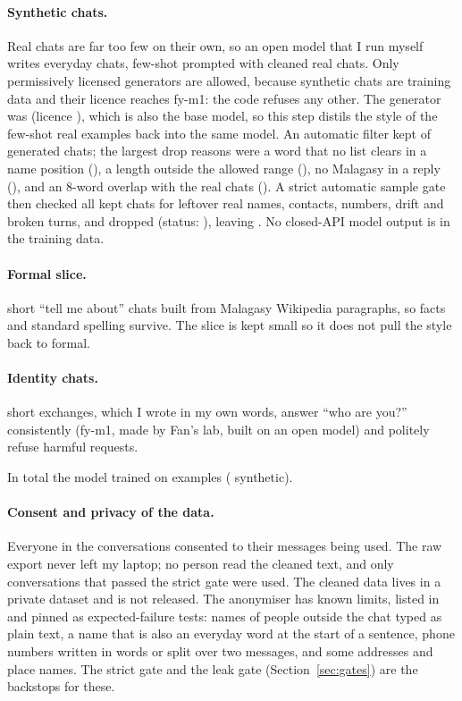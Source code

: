 \documentclass[11pt]{article}
\begin{document}
\paragraph{Synthetic chats.} Real chats are far too few on their own, so an open model that I run myself
writes everyday chats, few-shot prompted with cleaned real chats. Only permissively licensed generators are
allowed, because synthetic chats are training data and their licence reaches fy-m1: the code refuses any
other. The generator was \fySynthGenerator{} (licence \fySynthLicence{}), which is also the base model,
so this step distils the style of the few-shot real examples back into the same model. An automatic
filter kept \fySynthKept{} of \fySynthRaw{} generated chats; the largest drop reasons were a word that no
list clears in a name position (\fySynthDropUnknown{}), a length outside the allowed range
(\fySynthDropLength{}), no Malagasy in a reply (\fySynthDropNotMalagasy{}), and an 8-word overlap with the
real chats (\fySynthDropLeak{}). A strict automatic sample gate then checked all \fySynthChecked{} kept
chats for leftover real names, contacts, numbers, drift and broken turns, and dropped \fySynthGateDropped{}
(status: \fySynthGateStatus{}), leaving \fySynthGateKept{}. No closed-API model output is in the
training data.

\paragraph{Formal slice.} \fyDataFormal{} short ``tell me about'' chats built from Malagasy Wikipedia
paragraphs, so facts and standard spelling survive. The slice is kept small so it does not pull the
style back to formal.

\paragraph{Identity chats.} \fyDataIdentity{} short exchanges, which I wrote in my own words, answer
``who are you?'' consistently (fy-m1, made by Fan's lab, built on an open model) and politely refuse
harmful requests.

In total the model trained on \fyDataTrainExamples{} examples (\fyDataSynthetic{} synthetic).

\paragraph{Consent and privacy of the data.} Everyone in the conversations consented to their messages
being used. The raw export never left my laptop; no person read the cleaned text, and only conversations
that passed the strict gate were used. The cleaned data lives in a private dataset and is not released.
The anonymiser has known limits, listed in  and pinned as expected-failure
tests: names of people outside the chat typed as plain text, a name that is also an everyday word at the
start of a sentence, phone numbers written in words or split over two messages, and some addresses and
place names. The strict gate and the leak gate (Section~\ref{sec:gates}) are the backstops for these.
\end{document}

